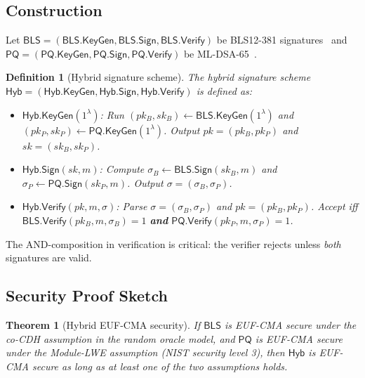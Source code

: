 \documentclass[11pt,a4paper]{article}
\newtheorem{theorem}{Theorem}[section]
\newtheorem{definition}{Definition}[section]
\begin{document}
\subsection{Construction}

Let $\textsf{BLS} = (\textsf{BLS.KeyGen}, \textsf{BLS.Sign}, \textsf{BLS.Verify})$ be
BLS12-381 signatures~\cite{boneh2001bls} and $\textsf{PQ} = (\textsf{PQ.KeyGen},
\textsf{PQ.Sign}, \textsf{PQ.Verify})$ be ML-DSA-65~\cite{fips204}.

\begin{definition}[Hybrid signature scheme]
\label{def:hybrid-sig}
The hybrid signature scheme $\textsf{Hyb} = (\textsf{Hyb.KeyGen}, \textsf{Hyb.Sign},
\textsf{Hyb.Verify})$ is defined as:
\begin{itemize}[leftmargin=2em]
  \item $\textsf{Hyb.KeyGen}(1^\lambda)$: Run $(pk_B, sk_B) \leftarrow \textsf{BLS.KeyGen}(1^\lambda)$
        and $(pk_P, sk_P) \leftarrow \textsf{PQ.KeyGen}(1^\lambda)$.
        Output $pk = (pk_B, pk_P)$ and $sk = (sk_B, sk_P)$.
  \item $\textsf{Hyb.Sign}(sk, m)$: Compute $\sigma_B \leftarrow \textsf{BLS.Sign}(sk_B, m)$
        and $\sigma_P \leftarrow \textsf{PQ.Sign}(sk_P, m)$.
        Output $\sigma = (\sigma_B, \sigma_P)$.
  \item $\textsf{Hyb.Verify}(pk, m, \sigma)$: Parse $\sigma = (\sigma_B, \sigma_P)$
        and $pk = (pk_B, pk_P)$. Accept iff
        $\textsf{BLS.Verify}(pk_B, m, \sigma_B) = 1$ \textbf{and}
        $\textsf{PQ.Verify}(pk_P, m, \sigma_P) = 1$.
\end{itemize}
\end{definition}

The AND-composition in verification is critical: the verifier rejects unless
\emph{both} signatures are valid.

\subsection{Security Proof Sketch}

\begin{theorem}[Hybrid EUF-CMA security]
\label{thm:hybrid-euf}
If $\textsf{BLS}$ is EUF-CMA secure under the co-CDH assumption in the random oracle
model, and $\textsf{PQ}$ is EUF-CMA secure under the Module-LWE assumption (NIST
security level 3), then $\textsf{Hyb}$ is EUF-CMA secure as long as at least one
of the two assumptions holds.
\end{theorem}
\end{document}
